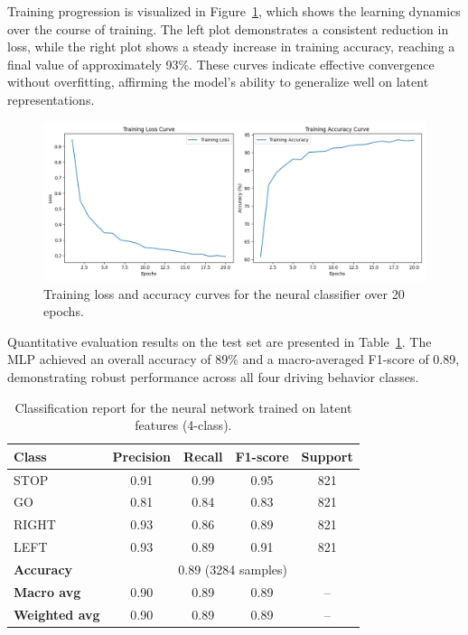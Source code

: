 Training progression is visualized in Figure~\ref{fig:loss_accuracy_plot}, which shows the learning dynamics over the course of training. The left plot demonstrates a consistent reduction in loss, while the right plot shows a steady increase in training accuracy, reaching a final value of approximately 93\%. These curves indicate effective convergence without overfitting, affirming the model's ability to generalize well on latent representations.

\begin{figure}[h]
    \centering
    \includegraphics[width=\textwidth]{img/classifier/training_loss_accuracy_4_classes.png}
    \caption{Training loss and accuracy curves for the neural classifier over 20 epochs.}
    \label{fig:loss_accuracy_plot}
\end{figure}

Quantitative evaluation results on the test set are presented in Table~\ref{tab:classification_report}. The MLP achieved an overall accuracy of 89\% and a macro-averaged F1-score of 0.89, demonstrating robust performance across all four driving behavior classes.

\begin{table}[h]
    \centering
    \begin{tabular}{lcccc}
        \toprule
        \textbf{Class} & \textbf{Precision} & \textbf{Recall} & \textbf{F1-score} & \textbf{Support} \\
        \midrule
        STOP & 0.91 & 0.99 & 0.95 & 821 \\
        GO & 0.81 & 0.84 & 0.83 & 821 \\
        RIGHT & 0.93 & 0.86 & 0.89 & 821 \\
        LEFT & 0.93 & 0.89 & 0.91 & 821 \\
        \midrule
        \textbf{Accuracy} & \multicolumn{4}{c}{0.89 (3284 samples)} \\
        \textbf{Macro avg} & 0.90 & 0.89 & 0.89 & -- \\
        \textbf{Weighted avg} & 0.90 & 0.89 & 0.89 & -- \\
        \bottomrule
    \end{tabular}
    \caption{Classification report for the neural network trained on latent features (4-class).}
    \label{tab:classification_report}
\end{table}

